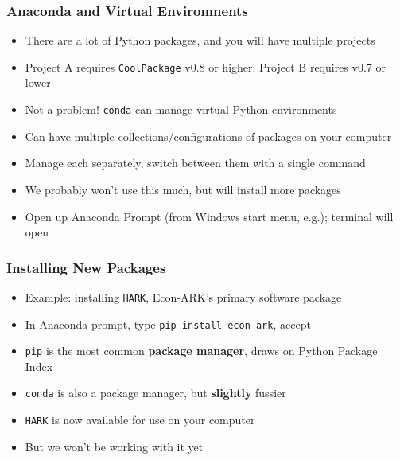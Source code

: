 \documentclass[aspectratio=169]{beamer}
\begin{document}
\begin{frame}
\frametitle{Anaconda and Virtual Environments}
\begin{itemize}
	\item There are a lot of Python packages, and you will have multiple projects
	
	\item Project A requires \texttt{CoolPackage} v0.8 or higher; Project B requires v0.7 or lower
	
	\item <2->Not a problem! \texttt{conda} can manage virtual Python environments
	
	\item <2->Can have multiple collections/configurations of packages on your computer
	
	\item <2->Manage each separately, switch between them with a single command
	
	\item <3->We probably won't use this much, but will install more packages
	
	\item <3->Open up Anaconda Prompt (from Windows start menu, e.g.); terminal will open
\end{itemize}
\end{frame}


\begin{frame}
\frametitle{Installing New Packages}
\begin{itemize}
	\item Example: installing \texttt{HARK}, Econ-ARK's primary software package
	
	\item In Anaconda prompt, type \texttt{pip install econ-ark}, accept
	
	\item <2->\texttt{pip} is the most common \textbf{package manager}, draws on Python Package Index
	
	\item <2->\texttt{conda} is also a package manager, but \textbf{slightly} fussier
	
	\item <3->\texttt{HARK} is now available for use on your computer
	
	\item <3->But we won't be working with it yet
\end{itemize}
\end{frame}
\end{document}
